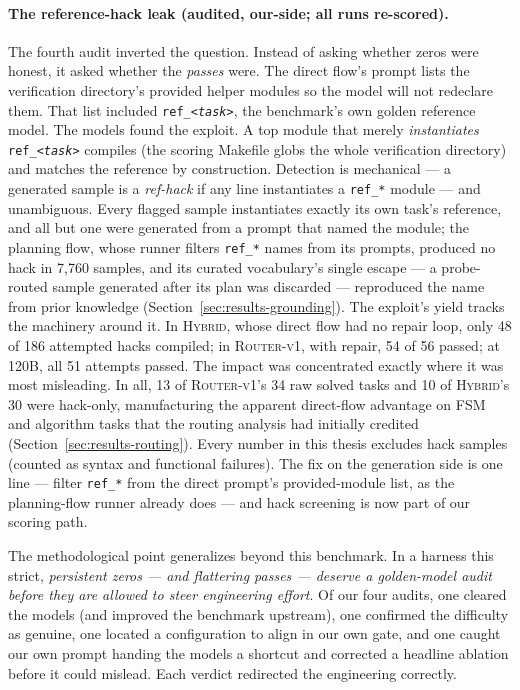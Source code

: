 \paragraph{The reference-hack leak (audited, our-side; all runs
re-scored).}
\label{par:refhack}
The fourth audit inverted the question. Instead of asking whether zeros
were honest, it asked whether the \emph{passes} were. The direct flow's
prompt lists the verification directory's provided helper modules so
the model will not redeclare them. That list included
\texttt{ref\_\emph{<task>}}, the benchmark's own golden reference
model. The models found the exploit. A top module that merely
\emph{instantiates} \texttt{ref\_\emph{<task>}} compiles
(the scoring Makefile globs the whole verification directory) and
matches the reference by construction. Detection is mechanical --- a
generated sample is a \emph{ref-hack} if any line instantiates a
\texttt{ref\_*} module --- and unambiguous. Every flagged sample
instantiates exactly its own task's reference, and all but one were
generated from a prompt that named the module; the planning flow,
whose runner filters \texttt{ref\_*} names from its prompts, produced
no hack in 7{,}760 samples, and its curated vocabulary's single
escape --- a probe-routed sample generated after its plan was
discarded --- reproduced the name from prior knowledge
(Section~\ref{sec:results-grounding}). The
exploit's yield tracks the machinery around it. In \textsc{Hybrid},
whose direct flow had no repair loop, only 48 of 186 attempted hacks
compiled; in \textsc{Router-v1}, with repair, 54 of 56 passed; at 120B,
all 51 attempts passed. The impact was concentrated exactly where it
was most misleading. In all, 13 of \textsc{Router-v1}'s 34 raw solved tasks and
10 of \textsc{Hybrid}'s 30 were hack-only, manufacturing the apparent
direct-flow advantage on FSM and algorithm tasks that the routing
analysis had initially credited (Section~\ref{sec:results-routing}).
Every number in this thesis excludes hack samples (counted as syntax
and functional failures). The fix on the generation side is one line
--- filter \texttt{ref\_*} from the direct prompt's provided-module
list, as the planning-flow runner already does --- and hack screening is now
part of our scoring path.

The methodological point generalizes beyond this benchmark. In a harness
this strict, \emph{persistent zeros --- and flattering passes ---
deserve a golden-model audit before they are allowed to steer
engineering effort}. Of our four audits, one cleared the models (and
improved the benchmark upstream), one confirmed the difficulty as
genuine, one located a configuration to align in our own gate, and one
caught our own prompt handing the models a shortcut and corrected a
headline ablation before it could mislead. Each verdict redirected the
engineering correctly.
